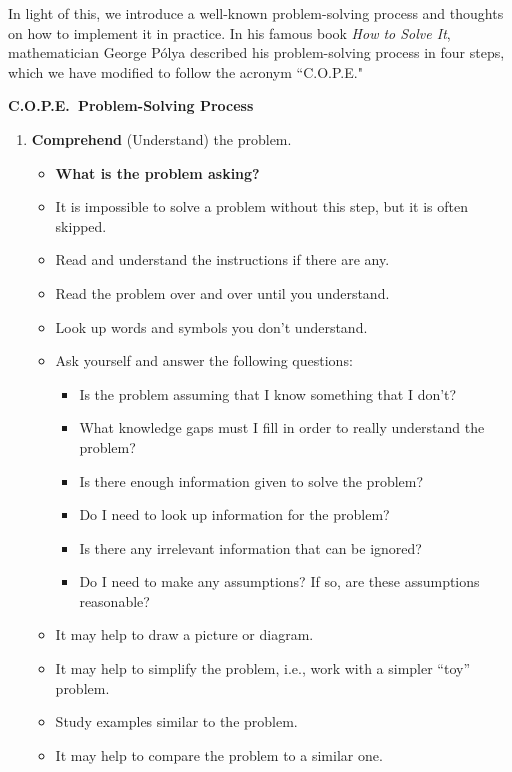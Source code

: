 In light of this, we introduce a well-known problem-solving process and thoughts on how to implement it in practice. In his famous book {\em How to Solve It}, mathematician George P\'{o}lya  described his problem-solving process in four steps, which we have modified to follow the acronym ``C.O.P.E."

\begin{center}
{\bf C.O.P.E.\ Problem-Solving Process}
\end{center}

\begin{enumerate}
\item {\bf Comprehend} (Understand) the problem.
\begin{itemize}
    \item {\bf What is the problem asking?}
    \item It is impossible to solve a problem without this step, but it is often skipped.
    \item Read and understand the instructions if there are any.
    \item Read the problem over and over until you understand.
    \item Look up words and symbols you don't understand.
    \item Ask yourself and answer the following questions:
    \begin{itemize}
        \item Is the problem assuming that I know something that I don't?
        \item What knowledge gaps must I fill in order to really understand the problem?
        \item Is there enough information given to solve the problem?
        \item Do I need to look up information for the problem?
        \item Is there any irrelevant information that can be ignored?
        \item Do I need to make any assumptions? If so, are these assumptions reasonable?
        \end{itemize}
    \item It may help to draw a picture or diagram.
    \item It may help to simplify the problem, i.e., work with a simpler ``toy'' problem.
    \item Study examples similar to the problem.
    \item It may help to compare the problem to a similar one.

\end{itemize}
\end{enumerate}
